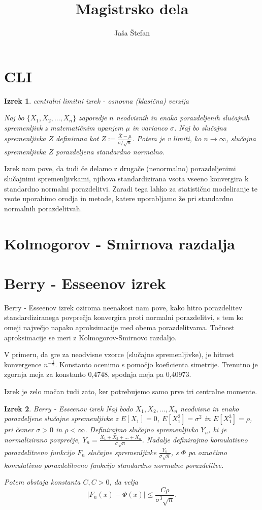 \documentclass[12pt]{article}
\title{Magistrsko dela}
\author{Jaša Štefan}
\newtheorem{theorem}{Izrek}
\begin{document}
\maketitle

\section{CLI}
\begin{theorem}{centralni limitni izrek - osnovna (klasična) verzija}

Naj bo $\{X_1, X_2, \dots, X_n\}$ zaporedje $n$ neodvisnih in enako porazdeljenih slučajnih spremenljivk z matematičnim upanjem $\mu$ in varianco $\sigma$. Naj bo slučajna spremenljivka $Z$ definirana kot $Z := \frac{\bar{X} - \mu}{\sigma / \sqrt{n}}$.  Potem je v limiti, ko $n \rightarrow \infty$, slučajna spremenljivka $Z$ porazdeljena standardno normalno.
\end{theorem}

Izrek nam pove, da tudi če delamo z drugače (nenormalno) porazdeljenimi slučajnimi spremenljivkami, njihova standardizirana vsota vseeno konvergira k standardno normalni porazdelitvi. Zaradi tega lahko za statistično modeliranje te vsote uporabimo orodja in metode, katere uporabljamo že pri standardno normalnih porazdelitvah. 


\section{Kolmogorov - Smirnova razdalja}




\section{Berry - Esseenov izrek}
Berry - Esseenov izrek oziroma neenakost nam pove, kako hitro porazdelitev standardiziranega povprečja konvergira proti normalni porazdelitvi, s tem ko omeji največjo napako aproksimacije med obema porazdelitvama. Točnost aproksimacije se meri z Kolmogorov-Smirnovo razdaljo. 

V primeru, da gre za neodvisne vzorce (slučajne spremenljivke), je hitrost konvergence $n^{-\frac{1}{2}}$. Konstanto ocenimo s pomočjo koeficienta simetrije. Trenutno je zgornja meja za konstanto 0,4748, spodnja meja pa 0,40973.

Izrek je zelo močan tudi zato, ker potrebujemo samo prve tri centralne momente.

\begin{theorem}{Berry - Esseenov izrek}
Naj bodo $X_1, X_2, \dots ,X_n$ neodvisne in enako porazdeljene slučajne spremenljivke z $E[X_1] = 0$, $E[X_1^2] = \sigma^2$ in $E[X_1^3] = \rho$, pri čemer $\sigma > 0$ in $\rho < \infty$.  Definirajmo slučajno spremenljivko $Y_n$, ki je normalizirano povprečje, $Y_n = \frac{X_1 + X_2+ \dots +X_n}{\sigma\sqrt{n}}$. 
Nadalje definirajmo komulativno porazdelitveno funkcijo $F_n$ slučajne spremenljivke $\frac{Y_n}{\sigma\sqrt{n}}$, s $\Phi$ pa označimo komulativno porazdelitveno funkcijo standardno normalne porazdelitve. 

Potem obstaja konstanta $C, C>0$, da velja 
$$ |F_n(x) - \Phi(x)| \leq \frac{C \rho}{\sigma^3\sqrt{n}}.$$
\end{theorem}
\end{document}
